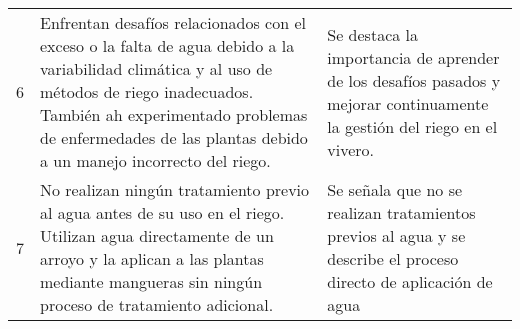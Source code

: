 \begin{longtable}{|p{0.5cm}|p{6.5cm}|p{5.5cm}|}
	6                                                 & Enfrentan desafíos relacionados con el exceso o la falta de agua debido a la variabilidad climática y al uso de métodos de riego inadecuados. También ah experimentado problemas de enfermedades de las plantas debido a un manejo incorrecto del riego.                                                                                                                      & Se destaca la importancia de aprender de los desafíos pasados y mejorar continuamente la gestión del riego en el vivero.                                                             \\
	7                                                 & No realizan ningún tratamiento previo al agua antes de su uso en el riego. Utilizan agua directamente de un arroyo y la aplican a las plantas mediante mangueras sin ningún proceso de tratamiento adicional.                                                                                                                                                                 & Se señala que no se realizan tratamientos previos al agua y se describe el proceso directo de aplicación de agua                                                                     \\
\end{longtable}